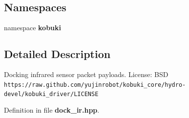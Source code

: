\subsection*{\-Namespaces}
\begin{DoxyCompactItemize}
\item 
namespace {\bf kobuki}
\end{DoxyCompactItemize}


\subsection{\-Detailed \-Description}
\-Docking infrared sensor packet payloads. \-License\-: \-B\-S\-D {\tt https\-://raw.\-github.\-com/yujinrobot/kobuki\-\_\-core/hydro-\/devel/kobuki\-\_\-driver/\-L\-I\-C\-E\-N\-S\-E} 

\-Definition in file {\bf dock\-\_\-ir.\-hpp}.

